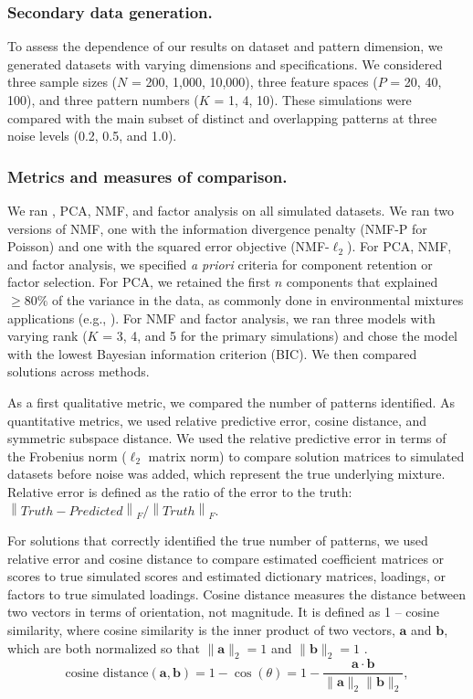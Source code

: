 \subsubsection{Secondary data generation.} 
To assess the dependence of our results on dataset and pattern dimension, we generated datasets with varying dimensions and specifications. We considered three sample sizes ($N$ = 200, 1,000, 10,000), three feature spaces ($P$ = 20, 40, 100), and three pattern numbers ($K$ = 1, 4, 10). These simulations were compared with the main subset of distinct and overlapping patterns at three noise levels (0.2, 0.5, and 1.0).

\subsubsection{Metrics and measures of comparison.}
\label{methods_metrics}
We ran \bnmfc, PCA, NMF, and factor analysis on all simulated datasets. We ran two versions of NMF, one with the information divergence penalty (NMF-P for Poisson) and one with the squared error objective (NMF-$\ell_2$). For PCA, NMF, and factor analysis, we specified \textit{a priori} criteria for component retention or factor selection. For PCA, we retained the first $n$ components that explained $\geq 80\%$ of the variance in the data, as commonly done in environmental mixtures applications (e.g., \cite{gibson2019overview}). For NMF and factor analysis, we ran three models with varying rank ($K$ = 3, 4, and 5 for the primary simulations) and chose the model with the lowest Bayesian information criterion (BIC). We then compared solutions across methods. 

As a first qualitative metric, we compared the number of patterns identified. As quantitative metrics, we used relative predictive error, cosine distance, and symmetric subspace distance. We used the relative predictive error in terms of the Frobenius norm ($\ell_2$ matrix norm) to compare solution matrices to simulated datasets before noise was added, which represent the true underlying mixture. Relative error is defined as the ratio of the error to the truth: $\left\lVert Truth - Predicted\right\rVert_F / \left\lVert  Truth\right\rVert_F$. 

For solutions that correctly identified the true number of patterns, we used relative error and cosine distance to compare estimated coefficient matrices or scores to true simulated scores and estimated dictionary matrices, loadings, or factors to true simulated loadings. Cosine distance measures the distance between two vectors in terms of orientation, not magnitude. It is defined as 1 -- cosine similarity, where cosine similarity is the inner product of two vectors, $\mathbf{a}$ and $\mathbf{b}$, which are both normalized so that $\|\mathbf{a}\|_2 = 1$ and $\|\mathbf{b}\|_2 = 1$ \citep{tan2016introduction}. 
\begin{equation}
\text{cosine distance}(\mathbf{a}, \mathbf{b}) = 1 - \cos (\theta)=1 - \frac{\mathbf{a} \cdot \mathbf{b}}{\|\mathbf{a}\|_2\|\mathbf{b}\|_2},
\end{equation}

